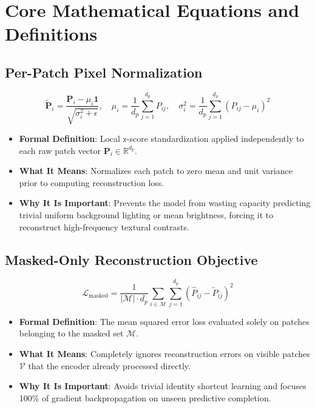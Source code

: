 \documentclass[11pt,a4paper]{article}
\theoremstyle{definition}
\begin{document}
\section{Core Mathematical Equations and Definitions}

\subsection{Per-Patch Pixel Normalization}
{\boldmath
\begin{equation}
\tilde{\mathbf{P}}_i = \frac{\mathbf{P}_i - \mu_i \mathbf{1}}{\sqrt{\sigma_i^2 + \epsilon}}, \quad \mu_i = \frac{1}{d_p}\sum_{j=1}^{d_p} P_{ij}, \quad \sigma_i^2 = \frac{1}{d_p}\sum_{j=1}^{d_p} (P_{ij} - \mu_i)^2
\end{equation}
}
\begin{itemize}
    \item \textbf{Formal Definition}: Local z-score standardization applied independently to each raw patch vector $\mathbf{P}_i \in \mathbb{R}^{d_p}$.
    \item \textbf{What It Means}: Normalizes each patch to zero mean and unit variance prior to computing reconstruction loss.
    \item \textbf{Why It Is Important}: Prevents the model from wasting capacity predicting trivial uniform background lighting or mean brightness, forcing it to reconstruct high-frequency textural contrasts.
\end{itemize}

\subsection{Masked-Only Reconstruction Objective}
{\boldmath
\begin{equation}
\mathcal{L}_{\text{masked}} = \frac{1}{|\mathcal{M}| \cdot d_p} \sum_{i \in \mathcal{M}} \sum_{j=1}^{d_p} (\hat{P}_{ij} - \tilde{P}_{ij})^2
\end{equation}
}
\begin{itemize}
    \item \textbf{Formal Definition}: The mean squared error loss evaluated solely on patches belonging to the masked set $\mathcal{M}$.
    \item \textbf{What It Means}: Completely ignores reconstruction errors on visible patches $\mathcal{V}$ that the encoder already processed directly.
    \item \textbf{Why It Is Important}: Avoids trivial identity shortcut learning and focuses 100\% of gradient backpropagation on unseen predictive completion.
\end{itemize}
\end{document}
